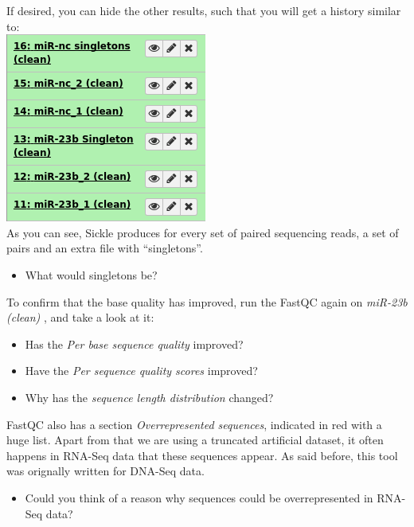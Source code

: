 If desired, you can hide the other results, such that you will get a history similar to:\\
\includegraphics[scale=0.55]{figures/qc_07.png}\\
As you can see, Sickle produces for every set of paired sequencing reads, a set of pairs and an extra file with ``singletons''.
\begin{itemize}
	\item What would singletons be?
\end{itemize}
To confirm that the base quality has improved, run the FastQC again on \textit{ miR-23b (clean) }, and take a look at it:
\begin{itemize}
	\item Has the \textit{Per base sequence quality} improved?
	\item Have the \textit{Per sequence quality scores} improved?
	\item Why has the \textit{sequence length distribution} changed?
\end{itemize}
FastQC also has a section \textit{Overrepresented sequences}, indicated in red with a huge list. Apart from that we are using a truncated artificial dataset, it often happens in RNA-Seq data that these sequences appear. As said before, this tool was orignally written for DNA-Seq data.
\begin{itemize}
	\item Could you think of a reason why sequences could be overrepresented in RNA-Seq data?
\end{itemize}
